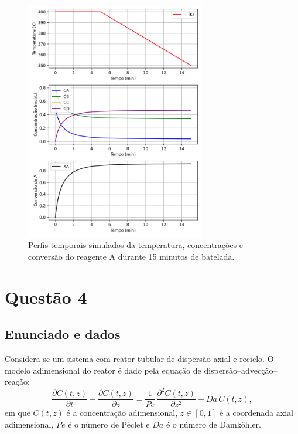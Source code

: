\documentclass{article}
\begin{document}


\begin{figure}[ht]
  \centering
  \includegraphics[width=0.7\textwidth]{figuras/questao3_reator.png}
  \caption{Perfis temporais simulados da temperatura, concentrações e conversão do reagente A durante 15 minutos de batelada.}
  \label{fig:questao3}
\end{figure}

\section{Questão 4}

\subsection*{Enunciado e dados}
Considera-se um sistema com reator tubular de dispersão axial e reciclo. O modelo adimensional do reator é dado pela equação de dispersão--advecção--reação:
\begin{equation}
  \frac{\partial C(t,z)}{\partial t} + \frac{\partial C(t,z)}{\partial z} = \frac{1}{Pe}\,\frac{\partial^2 C(t,z)}{\partial z^2} - Da\,C(t,z),
  \label{eq:edp-q4}
\end{equation}
em que $C(t,z)$ é a concentração adimensional, $z \in [0,1]$ é a coordenada axial adimensional, $Pe$ é o número de Péclet e $Da$ é o número de Damköhler.
\end{document}
